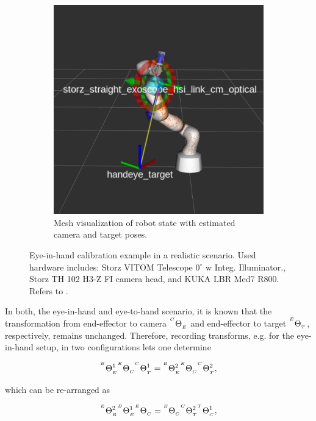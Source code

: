 \begin{figure}
\begin{subfigure}[b]{0.49\textwidth}
        \includegraphics[width=\textwidth]{introduction/img/aruco_world.png}
        \caption{Mesh visualization of robot state with estimated camera and target poses.}
    \end{subfigure}
    \caption{Eye-in-hand calibration example in a realistic scenario. Used hardware includes: Storz VITOM Telescope $0^\circ$ w Integ. Illuminator., Storz TH 102 H3-Z FI camera head, and KUKA LBR Med7 R800. Refers to .}
    \label{in:fig:eye_in_hand_setup}
\end{figure}
In both, the eye-in-hand and eye-to-hand scenario, it is known that the transformation from end-effector to camera ${}^{^C}\Theta_{_E}$ and end-effector to target ${}^{^E}\Theta_{_T}$, respectively, remains unchanged. Therefore, recording transforms, e.g. for the eye-in-hand setup, in two configurations lets one determine

\begin{equation}
    {}^{^B}\Theta_{_E}^{1}{}^{^E}\Theta_{_C}{}^{^C}\Theta_{_T}^{1} = {}^{^B}\Theta_{_E}^{2}{}^{^E}\Theta_{_C}{}^{^C}\Theta_{_T}^{2},
\end{equation}

which can be re-arranged as

\begin{equation}
    {}^{^E}\Theta_{_B}^{2}{}^{^B}\Theta_{_E}^{1}{}^{^E}\Theta_{_C} = {}^{^E}\Theta_{_C}{}^{^C}\Theta_{_T}^{2}{}^{^T}\Theta_{_C}^{1},
\end{equation}

